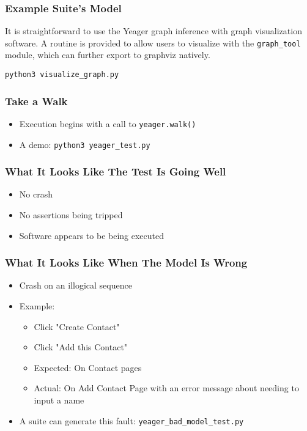 \begin{frame}
  \frametitle{Example Suite's Model}
  It is straightforward to use the Yeager graph inference with graph visualization software. A routine is provided to allow users to visualize with the \texttt{graph\_tool} module, which can further export to graphviz natively.

  \texttt{python3 visualize\_graph.py} %
\end{frame}

\begin{frame}
  \frametitle{Take a Walk}
  \begin{itemize}
    \item Execution begins with a call to \texttt{yeager.walk()}
    \item A demo: \texttt{python3 yeager\_test.py} %
  \end{itemize}
\end{frame}

\begin{frame}
  \frametitle{What It Looks Like The Test Is Going Well}
  \begin{itemize}
    \item No crash
    \item No assertions being tripped
    \item Software appears to be being executed
  \end{itemize}
\end{frame}

\begin{frame}
  \frametitle{What It Looks Like When The Model Is Wrong}
  \begin{itemize}
    \item Crash on an illogical sequence
    \item Example:
    \begin{itemize}
      \item Click "Create Contact"
      \item Click "Add this Contact"
      \item Expected: On Contact pages
      \item Actual: On Add Contact Page with an error message about needing to input a name
    \end{itemize}
    \item A suite can generate this fault: \texttt{yeager\_bad\_model\_test.py} %
  \end{itemize}
\end{frame}

